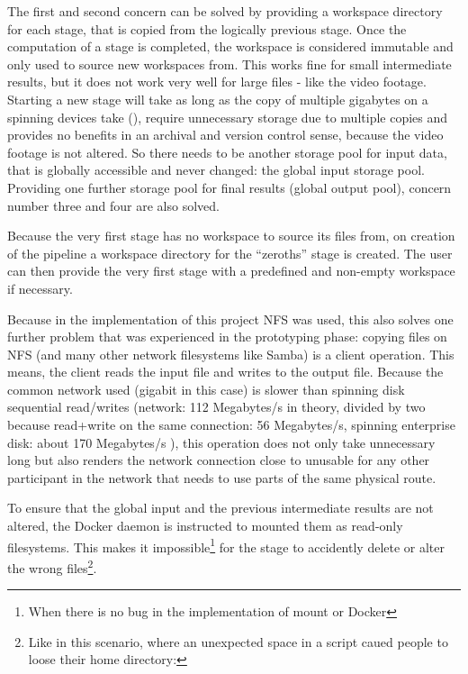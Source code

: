 The first and second concern can be solved by providing a workspace directory for each stage, that is copied from the logically previous stage.
Once the computation of a stage is completed, the workspace is considered immutable and only used to source new workspaces from.
This works fine for small intermediate results, but it does not work very well for large files - like the video footage.
Starting a new stage will take as long as the copy of multiple gigabytes on a spinning devices take (), require unnecessary storage due to multiple copies and provides no benefits in an archival and version control sense, because the video footage is not altered.
So there needs to be another storage pool for input data, that is globally accessible and never changed: the global input storage pool.
Providing one further storage pool for final results (global output pool), concern number three and four are also solved.

Because the very first stage has no workspace to source its files from, on creation of the pipeline a workspace directory for the \enquote{zeroths} stage is created.
The user can then provide the very first stage with a predefined and non-empty workspace if necessary.

Because in the implementation of this project NFS was used, this also solves one further problem that was experienced in the prototyping phase: copying files on NFS (and many other network filesystems like Samba) is a client operation.
This means, the client reads the input file and writes to the output file.
Because the common network used (gigabit in this case) is slower than spinning disk sequential read/writes (network: 112 Megabytes/s in theory, divided by two because read+write on the same connection: 56 Megabytes/s, spinning enterprise disk: about 170 Megabytes/s ), this operation does not only take unnecessary long but also renders the network connection close to unusable for any other participant in the network that needs to use parts of the same physical route.

To ensure that the global input and the previous intermediate results are not altered, the Docker daemon is instructed to mounted them as read-only filesystems.
This makes it impossible\footnote{When there is no bug in the implementation of mount or Docker} for the stage to accidently delete or alter the wrong files\footnote{Like in this scenario, where an unexpected space in a script caued people to loose their home directory: }.


